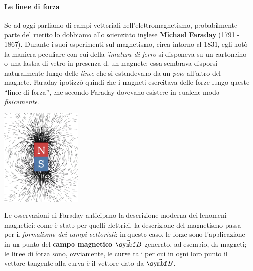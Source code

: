 \paragraph{Le linee di forza}
Se ad oggi parliamo di campi vettoriali nell'elettromagnetismo, probabilmente parte del merito lo dobbiamo allo scienziato inglese \textbf{Michael Faraday} (1791 - 1867). Durante i suoi esperimenti sul magnetismo, circa intorno al 1831, egli notò la maniera peculiare con cui della \textit{limatura di ferro} si disponeva su un cartoncino o una lastra di vetro in presenza di un magnete: essa sembrava disporsi naturalmente lungo delle \textit{linee} che si estendevano da un \textit{polo} all'altro del magnete. Faraday ipotizzò quindi che i magneti esercitava delle forze lungo queste ``linee di forza'', che secondo Faraday dovevano esistere in qualche modo \textit{fisicamente}.
\begin{center}
	\includegraphics[width=0.3\textwidth]{images/chp7/chp7faradayfilatura.pdf}
\end{center}
Le osservazioni di Faraday anticipano la descrizione moderna dei fenomeni magnetici: come è stato per quelli elettrici, la descrizione del magnetismo passa per il \textit{formalismo dei campi vettoriali}: in questo caso, le forze sono l'applicazione in un punto del \textbf{campo magnetico} $\vba{B}$ generato, ad esempio, da magneti; le linee di forza sono, ovviamente, le curve tali per cui in ogni loro punto il vettore tangente alla curva è il vettore dato da $\vba{B}$.
